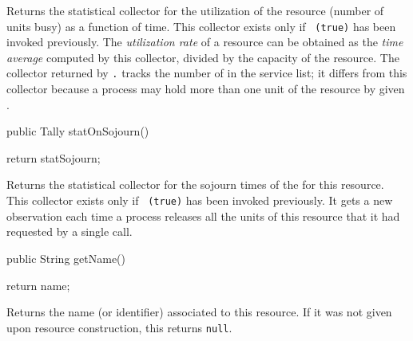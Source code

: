 \begin{tabb}  Returns the statistical collector for the utilization
  of the resource (number of units busy) as a function of time.
  This collector exists only if ~\texttt{(true)}
  has been invoked previously.  
  The {\em utilization rate\/} of a resource can be obtained as the
  {\em time average\/} computed by this collector, divided by the
  capacity of the resource.
  The collector returned by \texttt{.}%
  tracks the number of 
  in the service list;
  it differs from this collector because a process may hold more than one
  unit of the resource by given .
\end{tabb}
\begin{htmlonly}
\end{htmlonly}
\begin{code}

   public Tally statOnSojourn() \begin{hide} {
      return statSojourn;
   }\end{hide}
\end{code}
\begin{tabb}  Returns the statistical collector for the sojourn times of
  the  for this resource.
  This collector exists only if ~\texttt{(true)} has been invoked
  previously.  
  It gets a new observation each time a process releases all the units
  of this resource that it had requested by a single 
  call.
\end{tabb}
\begin{htmlonly}
\end{htmlonly}
\begin{code}

   public String getName()\begin{hide} {
      return name;
   }\end{hide}
\end{code}
\begin{tabb}   Returns the name (or identifier) associated to this
  resource.  If it was not given upon resource construction, this returns
   \texttt{null}.
\end{tabb}
\begin{htmlonly}
\end{htmlonly}
